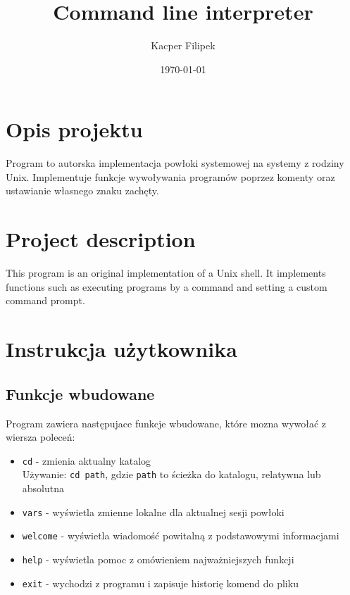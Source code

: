 \documentclass{article}
\title{Command line interpreter}
\author{Kacper Filipek}
\date{\today}
\begin{document}
\selectfont

\maketitle

\newpage

\section{Opis projektu}

Program to autorska implementacja powłoki systemowej na systemy z rodziny Unix. Implementuje funkcje wywoływania programów poprzez
komenty oraz ustawianie własnego znaku zachęty.

\section{Project description}

This program is an original implementation of a Unix shell. It implements functions such as executing programs by 
a command and setting a custom command prompt.

\section{Instrukcja użytkownika}

\subsection*{Funkcje wbudowane}
Program zawiera następujace funkcje wbudowane, które mozna wywołać z wiersza poleceń:
\begin{itemize}
    \item \texttt{cd} - zmienia aktualny katalog\\
    Używanie: \texttt{cd path}, gdzie \texttt{path} to ścieżka do katalogu, relatywna lub absolutna
    \item \texttt{vars} - wyświetla zmienne lokalne dla aktualnej sesji powłoki
    \item \texttt{welcome} - wyświetla wiadomość powitalną z podstawowymi informacjami
    \item \texttt{help} - wyświetla pomoc z omówieniem najważniejszych funkcji
    \item \texttt{exit} - wychodzi z programu i zapisuje historię komend do pliku
\end{itemize}
\end{document}
